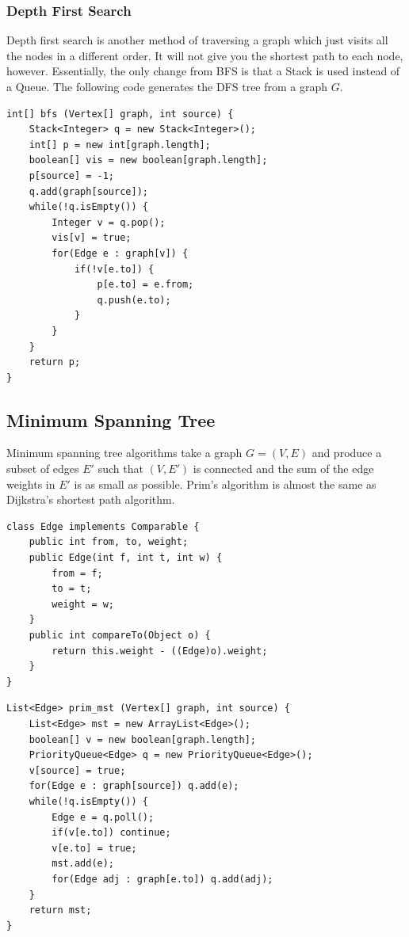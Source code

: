 \documentclass[a4paper,12pt]{article}
\begin{document}
\subsubsection{Depth First Search}

Depth first search is another method of traversing a graph which just visits all the nodes in a different order. It will not give you the shortest path to each node, however. Essentially, the only change from BFS is that a Stack is used instead of a Queue. The following code generates the DFS tree from a graph $G$.

\begin{lstlisting}
int[] bfs (Vertex[] graph, int source) {
	Stack<Integer> q = new Stack<Integer>();
	int[] p = new int[graph.length];
	boolean[] vis = new boolean[graph.length];
	p[source] = -1;
	q.add(graph[source]);
	while(!q.isEmpty()) {
		Integer v = q.pop();
		vis[v] = true;
		for(Edge e : graph[v]) {
			if(!v[e.to]) {
				p[e.to] = e.from;
				q.push(e.to);
			}
		}
	}
	return p;
}
\end{lstlisting}

\subsection{Minimum Spanning Tree}

Minimum spanning tree algorithms take a graph $G = (V,E)$ and produce a subset of edges $E'$ such that $(V,E')$ is connected and the sum of the edge weights in $E'$ is as small as possible. Prim's algorithm is almost the same as Dijkstra's shortest path algorithm.

\begin{lstlisting}
class Edge implements Comparable {
	public int from, to, weight;
	public Edge(int f, int t, int w) {
		from = f;
		to = t;
		weight = w;
	}
	public int compareTo(Object o) {
		return this.weight - ((Edge)o).weight;
	}
}
\end{lstlisting}

\begin{lstlisting}
List<Edge> prim_mst (Vertex[] graph, int source) {
	List<Edge> mst = new ArrayList<Edge>();
	boolean[] v = new boolean[graph.length];
	PriorityQueue<Edge> q = new PriorityQueue<Edge>();
	v[source] = true;
	for(Edge e : graph[source]) q.add(e);
	while(!q.isEmpty()) {
		Edge e = q.poll();
		if(v[e.to]) continue;
		v[e.to] = true;
		mst.add(e);
		for(Edge adj : graph[e.to]) q.add(adj);
	}
	return mst;
}
\end{lstlisting}
\end{document}
